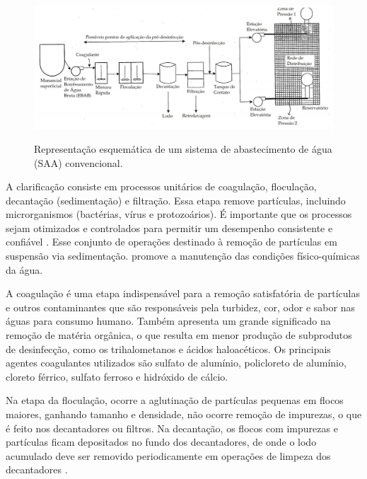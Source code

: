 \begin{figure}[h]
\caption{\small Representação esquemática de um sistema de abastecimento de água (SAA) convencional.}
\includegraphics[scale=0.55]{images/tratamento da agua.png}
\label{fig01}
\end{figure}


A clarificação consiste em processos unitários de coagulação, floculação, decantação (sedimentação) e filtração. Essa etapa remove partículas, incluindo microrganismos (bactérias, vírus e protozoários). É importante que os processos sejam otimizados e controlados para permitir um desempenho consistente e confiável \cite{who17}. Esse conjunto de operações destinado à remoção de partículas em suspensão via sedimentação. promove a manutenção das condições físico-químicas da água.

A coagulação é uma etapa indispensável para a remoção satisfatória de partículas e outros contaminantes que são responsáveis pela turbidez, cor, odor e sabor nas águas para consumo humano. Também apresenta um grande significado na remoção de matéria orgânica, o que resulta em menor produção de subprodutos de desinfecção, como os trihalometanos e ácidos haloacéticos. Os principais agentes coagulantes utilizados são sulfato de alumínio, policloreto de alumínio, cloreto férrico, sulfato ferroso e hidróxido de cálcio.

Na etapa da floculação, ocorre a aglutinação de partículas pequenas em flocos maiores, ganhando tamanho e densidade, não ocorre remoção de impurezas, o que é feito nos decantadores ou filtros. Na decantação, os flocos com impurezas e partículas ficam depositados no fundo dos decantadores, de onde o lodo acumulado deve ser removido periodicamente em operações de limpeza dos decantadores \cite{brasilb}. 

